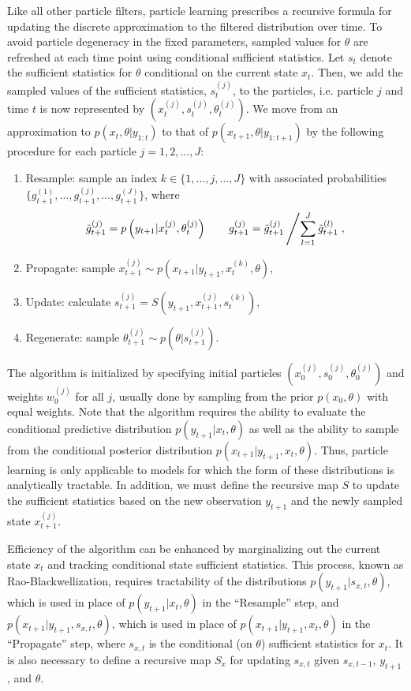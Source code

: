 \documentclass{article}
\begin{document}
Like all other particle filters, particle learning prescribes a recursive formula for updating the discrete approximation to the filtered distribution over time. To avoid particle degeneracy in the fixed parameters, sampled values for $\theta$ are refreshed at each time point using conditional sufficient statistics. Let $s_t$ denote the sufficient statistics for $\theta$ conditional on the current state $x_t$. Then, we add the sampled values of the sufficient statistics, $s_t^{(j)}$, to the particles, i.e. particle $j$ and time $t$ is now represented by $\left(x_t^{(j)},s_t^{(j)},\theta_t^{(j)}\right)$. We move from an approximation to $p(x_t,\theta|y_{1:t})$ to that of $p(x_{t+1},\theta|y_{1:t+1})$ by the following procedure for each particle $j = 1,2,\ldots,J$:
\begin{enumerate}
\item Resample: sample an index $k \in \{1,\ldots,j,\ldots,J\}$ with associated probabilities $\{g_{t+1}^{(1)},\ldots,g_{t+1}^{(j)},\ldots,g_{t+1}^{(J)}\}$, where \[\tilde{g}_{t+1}^{(j)} = p\left(y_{t+1}|x_t^{(j)},\theta_t^{(j)}\right) \qquad g_{t+1}^{(j)} = \tilde{g}_{t+1}^{(j)} \left/ \sum_{l=1}^J \tilde{g}_{t+1}^{(l)}\right.,\]
\item Propagate: sample $x_{t+1}^{(j)} \sim p\left(x_{t+1}|y_{t+1},x_t^{(k)},\theta\right)$,
\item Update: calculate $s_{t+1}^{(j)} = S\left(y_{t+1},x_{t+1}^{(j)},s_t^{(k)}\right)$,
\item Regenerate: sample $\theta_{t+1}^{(j)} \sim p\left(\theta|s_{t+1}^{(j)}\right)$.
\end{enumerate}
The algorithm is initialized by specifying initial particles $\left(x_0^{(j)},s_0^{(j)},\theta_0^{(j)}\right)$ and weights $w_0^{(j)}$ for all $j$, usually done by sampling from the prior $p(x_0,\theta)$ with equal weights. Note that the algorithm requires the ability to evaluate the conditional predictive distribution $p(y_{t+1}|x_t,\theta)$ as well as the ability to sample from the conditional posterior distribution $p(x_{t+1}|y_{t+1},x_t,\theta)$. Thus, particle learning is only applicable to models for which the form of these distributions is analytically tractable. In addition, we must define the recursive map $S$ to update the sufficient statistics based on the new observation $y_{t+1}$ and the newly sampled state $x_{t+1}^{(j)}$.

Efficiency of the algorithm can be enhanced by marginalizing out the current state $x_t$ and tracking conditional state sufficient statistics. This process, known as Rao-Blackwellization, requires tractability of the distributions $p(y_{t+1}|s_{x,t},\theta)$, which is used in place of $p(y_{t+1}|x_t,\theta)$ in the ``Resample'' step, and $p(x_{t+1}|y_{t+1},s_{x,t},\theta)$, which is used in place of $p(x_{t+1}|y_{t+1},x_t,\theta)$ in the ``Propagate'' step, where $s_{x,t}$ is the conditional (on $\theta$) sufficient statistics for $x_t$. It is also necessary to define a recursive map $S_x$ for updating $s_{x,t}$ given $s_{x,t-1}$, $y_{t+1}$, and $\theta$.
\end{document}

